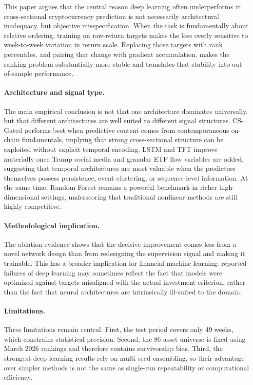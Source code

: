 This paper argues that the central reason deep learning often underperforms in
cross-sectional cryptocurrency prediction is not necessarily architectural
inadequacy, but objective misspecification.
When the task is fundamentally about relative ordering, training on raw-return
targets makes the loss overly sensitive to week-to-week variation in return
scale.
Replacing those targets with rank percentiles, and pairing that change with
gradient accumulation, makes the ranking problem substantially more stable and
translates that stability into out-of-sample performance.

\paragraph{Architecture and signal type.}
The main empirical conclusion is not that one architecture dominates
universally, but that different architectures are well suited to different
signal structures.
CS-Gated performs best when predictive content comes from contemporaneous
on-chain fundamentals, implying that strong cross-sectional structure can be
exploited without explicit temporal encoding.
LSTM and TFT improve materially once Trump social media and granular ETF flow
variables are added, suggesting that temporal architectures are most valuable
when the predictors themselves possess persistence, event clustering, or
sequence-level information.
At the same time, Random Forest remains a powerful benchmark in richer
high-dimensional settings, underscoring that traditional nonlinear methods are
still highly competitive.

\paragraph{Methodological implication.}
The ablation evidence shows that the decisive improvement comes less from a
novel network design than from redesigning the supervision signal and making
it trainable.
This has a broader implication for financial machine learning:
reported failures of deep learning may sometimes reflect the fact that models
were optimized against targets misaligned with the actual investment
criterion, rather than the fact that neural architectures are intrinsically
ill-suited to the domain.

\paragraph{Limitations.}
Three limitations remain central.
First, the test period covers only 49 weeks, which constrains statistical
precision.
Second, the 86-asset universe is fixed using March 2026 rankings and therefore
contains survivorship bias.
Third, the strongest deep-learning results rely on multi-seed ensembling, so
their advantage over simpler methods is not the same as single-run
repeatability or computational efficiency.


